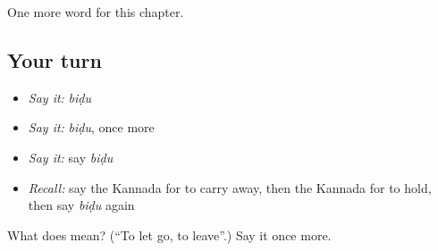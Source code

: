 \begin{grammarlens}[title={What you've built}]
One more word for this chapter.
\end{grammarlens}

\subsection*{Your turn}
\begin{itemize}
\raggedright
  \item \emph{Say it:} \emph{biḍu}
  \item \emph{Say it:} \emph{biḍu}, once more
  \item \emph{Say it:} say \emph{biḍu}
  \item \emph{Recall:} say the Kannada for to carry away, then the Kannada for to hold, then say \emph{biḍu} again
\end{itemize}

\begin{tcolorbox}[breakable,colback=teal!4,colframe=teal!35!black,title={Before you move on}]
What does  mean? (\textquotedblleft{}To let go, to leave\textquotedblright{}.) Say it once more.
\end{tcolorbox}
